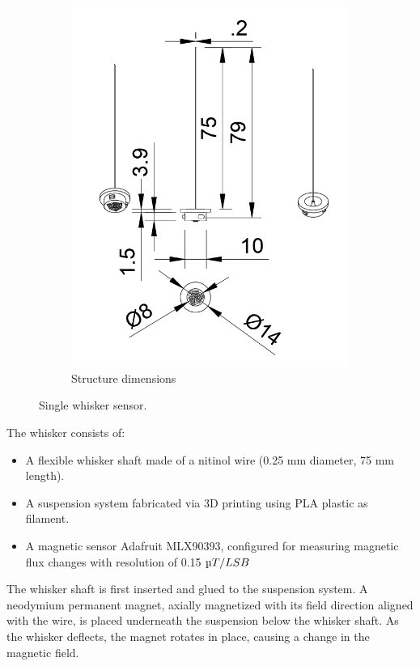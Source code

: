 \begin{figure}[ht]
\begin{subfigure}{0.31\textwidth}
        \includegraphics[width=\linewidth]{figures/whisker-dims}
        \caption{Structure dimensions} \label{fig:whisker-dims}
    \end{subfigure}
    \caption{Single whisker sensor.}
    \label{fig:whisker_composite}
\end{figure}

The whisker consists of:
\begin{itemize}
    \item A flexible whisker shaft made of a nitinol wire (0.25 mm diameter, 75 mm length).
    \item A suspension system fabricated via 3D printing using PLA plastic as filament.
    \item A magnetic sensor Adafruit MLX90393, configured for measuring magnetic flux changes with resolution of 0.15 $\micro T/LSB$
\end{itemize}
The whisker shaft is first inserted and glued to the suspension system.
A neodymium permanent magnet, axially magnetized with its field direction aligned with the wire, is placed underneath the suspension below the whisker shaft.
As the whisker deflects, the magnet rotates in place, causing a change in the magnetic field.


